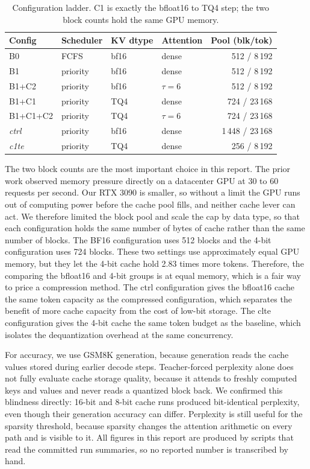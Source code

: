 \documentclass[conference]{IEEEtran}
\begin{document}
\begin{table}[H]
  \caption{Configuration ladder. C1 is exactly the bfloat16 to TQ4 step; the two
  block counts hold the same GPU memory.}
  \label{tab:ladder}
  \centering
  \small
  \begin{tabular}{@{}llllr@{}}
    \toprule
    Config & Scheduler & KV dtype & Attention & Pool (blk/tok) \\
    \midrule
    B0           & FCFS     & bf16 & dense          & 512 / 8\,192 \\
    B1           & priority & bf16 & dense          & 512 / 8\,192 \\
    B1+C2        & priority & bf16 & $\tau{=}6$      & 512 / 8\,192 \\
    B1+C1        & priority & TQ4  & dense          & 724 / 23\,168 \\
    B1+C1+C2     & priority & TQ4  & $\tau{=}6$      & 724 / 23\,168 \\
    \emph{ctrl}  & priority & bf16 & dense          & 1\,448 / 23\,168 \\
    \emph{c1te}  & priority & TQ4  & dense          & 256 / 8\,192 \\
    \bottomrule
  \end{tabular}
\end{table}

The two block counts are the most important choice in this report. The prior work observed memory pressure directly on a datacenter GPU at 30 to 60 requests per second. Our RTX 3090 is smaller, so without a limit the GPU runs out of computing power before the cache pool fills, and neither cache lever can act. We therefore limited the block pool and scale the cap by data type, so that each configuration holds the same number of bytes of cache rather than the same number of blocks. The BF16 configuration uses 512 blocks and the 4-bit configuration uses 724 blocks. These two settings use approximately equal GPU memory, but they let the 4-bit cache hold 2.83 times more tokens. Therefore, the comparing the bfloat16 and 4-bit groups is at equal memory, which is a fair way to price a compression method. The ctrl configuration gives the bfloat16 cache the same token capacity as the compressed configuration, which separates the benefit of more cache capacity from the cost of low-bit storage. The clte configuration gives the 4-bit cache the same token budget as the baseline, which isolates the dequantization overhead at the same concurrency.

For accuracy, we use GSM8K generation, because generation reads the cache values stored during earlier decode steps. Teacher-forced perplexity alone does not fully evaluate cache storage quality, because it attends to freshly computed keys and values and never reads a quantized block back. We confirmed this blindness directly: 16-bit and 8-bit cache runs produced bit-identical perplexity, even though their generation accuracy can differ. Perplexity is still useful for the sparsity threshold, because sparsity changes the attention arithmetic on every path and is visible to it. All figures in this report are produced by scripts that read the committed run summaries, so no reported number is transcribed by hand.
\end{document}
